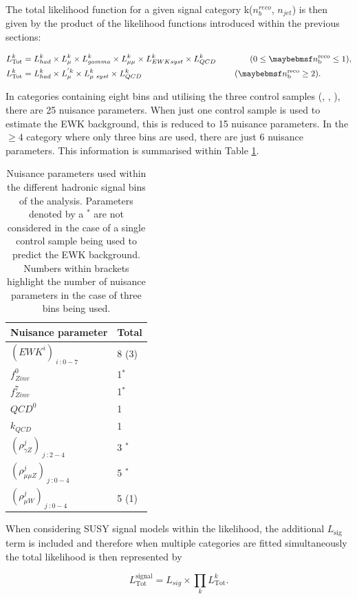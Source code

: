 The total likelihood function for a given signal category k($n_{b}^{reco}$, $n_{jet}$) is then given by the product of the likelihood functions introduced within the previous sections:

\begin{align}
L^{k}_{\text{Tot}} &= L^{k}_{had} \times  L^{k}_{\mu} \times  L^{k}_{\gamma} \times  L^{k}_{\mu\mu} \times  L^{k}_{EWK syst} \times  L^{k}_{QCD}  \qquad\qquad (0 \leq \nbreco \leq 1), \nonumber \\
L^{k}_{\text{Tot}} &= L^{k}_{had} \times  L^{'\xspace k }_{\mu} \times  L^{k}_{\mu\text{ }syst} \times  L^{k}_{QCD} \quad\qquad\qquad\qquad\qquad\qquad(\nbreco \geq 2).
\label{eq:totallikelihoodfunc}
\end{align}

In categories containing eight \theht bins and utilising the three control samples (\mupjets, \dimupjets, \gpjets), there are 25 nuisance parameters. When just one control sample is used to estimate the \ac{EWK} background, this is reduced to 15 nuisance parameters. In the \nbreco$\geq4$ category where only three \theht bins are used, there are just 6 nuisance parameters. This information is summarised within Table \ref{tab:nuisanceparameters}.

 \begin{table}[h!]
 \footnotesize
\begin{center}
\begin{tabular*}{0.45\textwidth}{@{\extracolsep{\fill}}ll}
\hline
Nuisance parameter & Total \\
\hline\hline
$(EWK^{i})_{\ i\ : 0-7}$ & 8 (3) \\
$f^{0}_{Zinv}$  & 1$^{*}$ \\
 $f^{7}_{Zinv}$  &1$^{*}$ \\
 $QCD^{0}$ & 1 \\
 $k_{QCD}$ & 1 \\
 $(\rho^{j}_{\gamma Z})_{\ j \ : 2-4}$  & 3 $^{*}$\\
 $(\rho^{j}_{\mu\mu Z})_{\ j \ : 0-4}$   & 5 $^{*}$ \\
 $(\rho^{j}_{\mu W})_{\ j \ : 0-4}$ & 5 (1) \\
\end{tabular*}
\end{center}
\caption[Nuisance parameters used within the different hadronic signal bins of the analysis]{Nuisance parameters used within the different hadronic signal bins of the analysis. Parameters denoted by a $^{*}$ are not considered in the case of a single control sample being used to predict the \ac{EWK} background. Numbers within brackets highlight the number of nuisance parameters in the case of three \theht bins being used.}\label{tab:nuisanceparameters}
\end{table}

When considering \ac{SUSY} signal models within the likelihood, the additional $L_{\text{sig}}$ term is included and therefore when multiple categories are fitted simultaneously the total likelihood is then represented by 

\begin{equation}
L^{\text{signal}}_{\text{Tot}} =  L_{sig} \times \prod_{k} L^{k}_{\text{Tot}}.
\end{equation}
